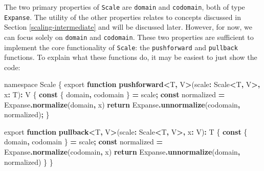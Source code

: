 \documentclass[
  openany]{book}
\newenvironment{Shaded}{\begin{snugshade}}{\end{snugshade}}
\newcommand{\ControlFlowTok}[1]{\textcolor[rgb]{0.13,0.29,0.53}{\textbf{#1}}}
\newcommand{\DataTypeTok}[1]{\textcolor[rgb]{0.13,0.29,0.53}{#1}}
\newcommand{\FunctionTok}[1]{\textcolor[rgb]{0.13,0.29,0.53}{\textbf{#1}}}
\newcommand{\ImportTok}[1]{#1}
\newcommand{\KeywordTok}[1]{\textcolor[rgb]{0.13,0.29,0.53}{\textbf{#1}}}
\newcommand{\NormalTok}[1]{#1}
\newcommand{\OperatorTok}[1]{\textcolor[rgb]{0.81,0.36,0.00}{\textbf{#1}}}
\theoremstyle{definition}
\theoremstyle{definition}
\theoremstyle{definition}
\theoremstyle{definition}
\theoremstyle{remark}
\begin{document}
The two primary properties of \texttt{Scale} are \texttt{domain} and \texttt{codomain}, both of type \texttt{Expanse}. The utility of the other properties relates to concepts discussed in Section \ref{scaling-intermediate} and will be discussed later. However, for now, we can focus solely on \texttt{domain} and \texttt{codomain}. These two properties are sufficient to implement the core functionality of \texttt{Scale}: the \texttt{pushforward} and \texttt{pullback} functions. To explain what these functions do, it may be easiest to just show the code:

\begin{Shaded}
\begin{Highlighting}[]
\ImportTok{namespace} \DataTypeTok{Scale}\NormalTok{ \{}
  \ImportTok{export} \KeywordTok{function} \FunctionTok{pushforward}\OperatorTok{\textless{}}\NormalTok{T}\OperatorTok{,}\NormalTok{ V}\OperatorTok{\textgreater{}}\NormalTok{(scale}\OperatorTok{:}\NormalTok{ Scale}\OperatorTok{\textless{}}\NormalTok{T}\OperatorTok{,}\NormalTok{ V}\OperatorTok{\textgreater{},}\NormalTok{ x}\OperatorTok{:}\NormalTok{ T)}\OperatorTok{:}\NormalTok{ V \{}
    \KeywordTok{const}\NormalTok{ \{ domain}\OperatorTok{,}\NormalTok{ codomain \} }\OperatorTok{=}\NormalTok{ scale}\OperatorTok{;}
    \KeywordTok{const}\NormalTok{ normalized }\OperatorTok{=}\NormalTok{ Expanse}\OperatorTok{.}\FunctionTok{normalize}\NormalTok{(domain}\OperatorTok{,}\NormalTok{ x)}
    \ControlFlowTok{return}\NormalTok{ Expanse}\OperatorTok{.}\FunctionTok{unnormalize}\NormalTok{(codomain}\OperatorTok{,}\NormalTok{ normalized)}\OperatorTok{;}
\NormalTok{  \}}

  \ImportTok{export} \KeywordTok{function} \FunctionTok{pullback}\OperatorTok{\textless{}}\NormalTok{T}\OperatorTok{,}\NormalTok{ V}\OperatorTok{\textgreater{}}\NormalTok{(scale}\OperatorTok{:}\NormalTok{ Scale}\OperatorTok{\textless{}}\NormalTok{T}\OperatorTok{,}\NormalTok{ V}\OperatorTok{\textgreater{},}\NormalTok{ x}\OperatorTok{:}\NormalTok{ V)}\OperatorTok{:}\NormalTok{ T \{}
    \KeywordTok{const}\NormalTok{ \{ domain}\OperatorTok{,}\NormalTok{ codomain \} }\OperatorTok{=}\NormalTok{ scale}\OperatorTok{;}
    \KeywordTok{const}\NormalTok{ normalized }\OperatorTok{=}\NormalTok{ Expanse}\OperatorTok{.}\FunctionTok{normalize}\NormalTok{(codomain}\OperatorTok{,}\NormalTok{ x)}
    \ControlFlowTok{return}\NormalTok{ Expanse}\OperatorTok{.}\FunctionTok{unnormalize}\NormalTok{(domain}\OperatorTok{,}\NormalTok{ normalized)}
\NormalTok{  \}}
\NormalTok{\}}
\end{Highlighting}
\end{Shaded}
\end{document}
